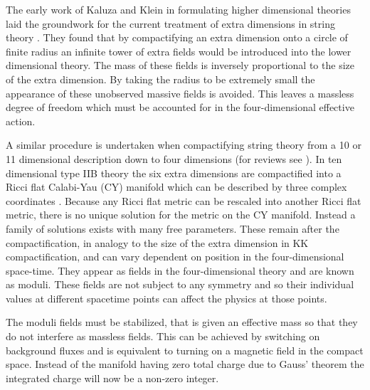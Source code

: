 The early work of Kaluza and Klein in formulating higher dimensional 
theories laid the groundwork for the current treatment of extra dimensions in
string theory \cite{Kaluza1921, Klein1926}. They found that by
compactifying an extra dimension onto a circle of finite radius an infinite
tower of extra fields would be introduced into the lower dimensional theory. The
mass of these fields is inversely proportional to the size of the extra
dimension. By taking the radius to be extremely small the appearance of these
unobserved massive fields is avoided. This leaves a
massless degree of freedom which must be accounted for in the four-dimensional
effective action. 


A similar procedure is undertaken when compactifying string theory from a
10 or 11 dimensional description down to four dimensions (for reviews see
\cite{douglas,grana}).
In ten dimensional type IIB theory the six extra dimensions are
compactified into a Ricci flat Calabi-Yau (CY) manifold which can be described
by three complex coordinates \cite{Yau1977}. 
Because any Ricci flat metric can be
rescaled into another Ricci flat metric, there is no unique solution for the
metric on the CY manifold. Instead a family of solutions exists with many free
parameters. These remain after the compactification, in
analogy to the size of the extra dimension in KK compactification, and can vary
dependent on position in the four-dimensional space-time. They appear as fields
in the four-dimensional theory and are known as moduli. 
These fields are not subject to any symmetry and so their individual values
at different spacetime points can affect the physics at those points.


The moduli fields must
be stabilized, that is given an effective mass so that they do not interfere as
massless fields. This can be achieved by switching on background fluxes and is
equivalent to turning on a magnetic field in the compact space. Instead of the
manifold having zero total charge due to Gauss' theorem the integrated charge
will now be a non-zero integer.






